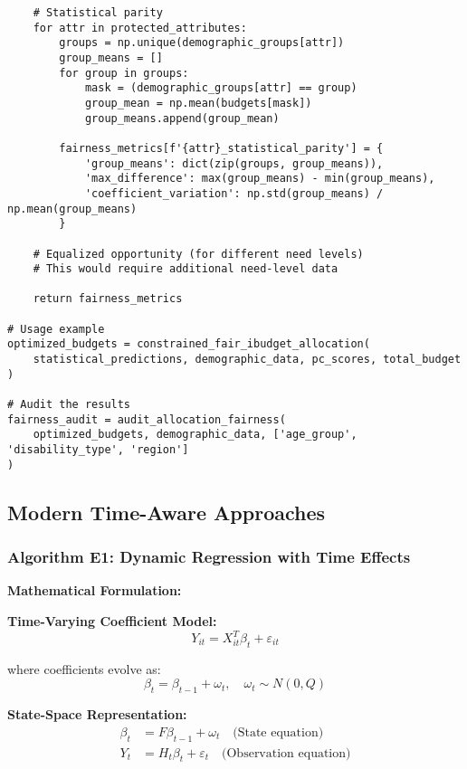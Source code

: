 \documentclass[12pt]{article}
\begin{document}
\begin{lstlisting}
    # Statistical parity
    for attr in protected_attributes:
        groups = np.unique(demographic_groups[attr])
        group_means = []
        for group in groups:
            mask = (demographic_groups[attr] == group)
            group_mean = np.mean(budgets[mask])
            group_means.append(group_mean)
        
        fairness_metrics[f'{attr}_statistical_parity'] = {
            'group_means': dict(zip(groups, group_means)),
            'max_difference': max(group_means) - min(group_means),
            'coefficient_variation': np.std(group_means) / np.mean(group_means)
        }
    
    # Equalized opportunity (for different need levels)
    # This would require additional need-level data
    
    return fairness_metrics

# Usage example
optimized_budgets = constrained_fair_ibudget_allocation(
    statistical_predictions, demographic_data, pc_scores, total_budget
)

# Audit the results
fairness_audit = audit_allocation_fairness(
    optimized_budgets, demographic_data, ['age_group', 'disability_type', 'region']
)
\end{lstlisting}

\subsection{Modern Time-Aware Approaches}

\subsubsection{Algorithm E1: Dynamic Regression with Time Effects}

\textbf{Mathematical Formulation:}

\textbf{Time-Varying Coefficient Model:}
\begin{equation}
Y_{it} = X_{it}^T \beta_t + \varepsilon_{it}
\end{equation}

where coefficients evolve as:
\begin{equation}
\beta_t = \beta_{t-1} + \omega_t, \quad \omega_t \sim N(0, Q)
\end{equation}

\textbf{State-Space Representation:}
\begin{align}
\beta_t &= F\beta_{t-1} + \omega_t \quad \text{(State equation)} \\
Y_t &= H_t\beta_t + \varepsilon_t \quad \text{(Observation equation)}
\end{align}
\end{document}
